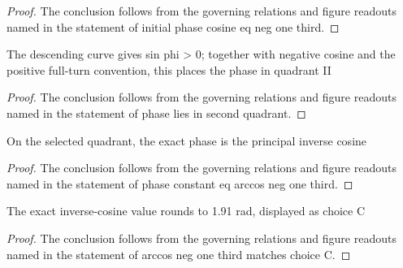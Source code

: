 \begin{proof}
  The conclusion follows from the governing relations and figure readouts named in the statement of initial phase cosine eq neg one third.
\end{proof}
\begin{lemma}
  \label{lem:physics:phyx-mini-0251:phyxminiproblems-problemphyxmini0251-phase-lies-in-second-quadrant}
  The descending curve gives sin phi > 0; together with negative cosine and the positive full-turn convention, this places the phase in quadrant II
\end{lemma}
\begin{proof}
  The conclusion follows from the governing relations and figure readouts named in the statement of phase lies in second quadrant.
\end{proof}
\begin{lemma}
  \label{lem:physics:phyx-mini-0251:phyxminiproblems-problemphyxmini0251-phase-constant-eq-arccos-neg-one-third}
  On the selected quadrant, the exact phase is the principal inverse cosine
\end{lemma}
\begin{proof}
  The conclusion follows from the governing relations and figure readouts named in the statement of phase constant eq arccos neg one third.
\end{proof}
\begin{lemma}
  \label{lem:physics:phyx-mini-0251:phyxminiproblems-problemphyxmini0251-arccos-neg-one-third-matches-choice-c}
  The exact inverse-cosine value rounds to 1.91 rad, displayed as choice C
\end{lemma}
\begin{proof}
  The conclusion follows from the governing relations and figure readouts named in the statement of arccos neg one third matches choice C.
\end{proof}
